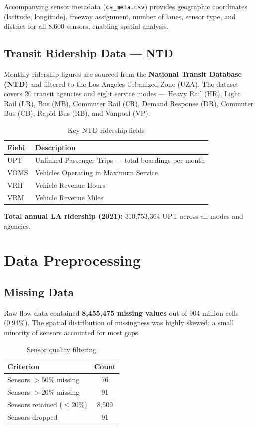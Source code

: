 \documentclass[12pt,a4paper]{article}
\begin{document}
Accompanying sensor metadata (\texttt{ca\_meta.csv}) provides geographic coordinates (latitude, longitude), freeway assignment, number of lanes, sensor type, and district for all 8,600 sensors, enabling spatial analysis.

\subsection{Transit Ridership Data — NTD}

Monthly ridership figures are sourced from the \textbf{National Transit Database (NTD)} and filtered to the Los Angeles Urbanized Zone (UZA). The dataset covers 20 transit agencies and eight service modes — Heavy Rail (HR), Light Rail (LR), Bus (MB), Commuter Rail (CR), Demand Response (DR), Commuter Bus (CB), Rapid Bus (RB), and Vanpool (VP).

\begin{table}[H]
\centering
\caption{Key NTD ridership fields}
\begin{tabular}{ll}
\toprule
\textbf{Field} & \textbf{Description} \\
\midrule
UPT  & Unlinked Passenger Trips — total boardings per month \\
VOMS & Vehicles Operating in Maximum Service \\
VRH  & Vehicle Revenue Hours \\
VRM  & Vehicle Revenue Miles \\
\bottomrule
\end{tabular}
\end{table}

\textbf{Total annual LA ridership (2021):} 310,753,364 UPT across all modes and agencies.

\section{Data Preprocessing}

\subsection{Missing Data}

Raw flow data contained \textbf{8,455,475 missing values} out of 904 million cells (0.94\%). The spatial distribution of missingness was highly skewed: a small minority of sensors accounted for most gaps.

\begin{table}[H]
\centering
\caption{Sensor quality filtering}
\begin{tabular}{lc}
\toprule
\textbf{Criterion} & \textbf{Count} \\
\midrule
Sensors $>50\%$ missing  & 76  \\
Sensors $>20\%$ missing  & 91  \\
Sensors retained ($\leq 20\%$) & 8,509 \\
Sensors dropped          & 91  \\
\bottomrule
\end{tabular}
\end{table}
\end{document}
